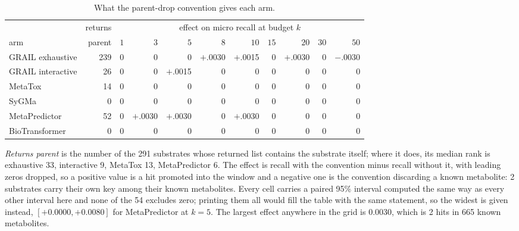 \begin{table}[h]
\centering\scriptsize
\begin{threeparttable}
\caption{What the parent-drop convention gives each arm.}
\label{tab:si-parentdrop}
\begin{tabular}{lrrrrrrrrrr}
\toprule
 & returns & \multicolumn{9}{c}{effect on micro recall at budget $k$} \\
\cmidrule(lr){3-11}
arm & parent & $1$ & $3$ & $5$ & $8$ & $10$ & $15$ & $20$ & $30$ & $50$ \\
\midrule
GRAIL exhaustive & 239 & $0$ & $0$ & $0$ & $+$.0030 & $+$.0015 & $0$ & $+$.0030 & $0$ & $-$.0030 \\
GRAIL interactive & 26 & $0$ & $0$ & $+$.0015 & $0$ & $0$ & $0$ & $0$ & $0$ & $0$ \\
MetaTox & 14 & $0$ & $0$ & $0$ & $0$ & $0$ & $0$ & $0$ & $0$ & $0$ \\
SyGMa & 0 & $0$ & $0$ & $0$ & $0$ & $0$ & $0$ & $0$ & $0$ & $0$ \\
MetaPredictor & 52 & $0$ & $+$.0030 & $+$.0030 & $0$ & $+$.0030 & $0$ & $0$ & $0$ & $0$ \\
BioTransformer & 0 & $0$ & $0$ & $0$ & $0$ & $0$ & $0$ & $0$ & $0$ & $0$ \\
\bottomrule
\end{tabular}
\begin{tablenotes}[flushleft]\footnotesize
\item \emph{Returns parent} is the number of the 291 substrates whose returned list contains the substrate itself; where it does, its median rank is exhaustive 33, interactive 9, MetaTox 13, MetaPredictor 6. The effect is recall with the convention minus recall without it, with leading zeros dropped, so a positive value is a hit promoted into the window and a negative one is the convention discarding a known metabolite: 2 substrates carry their own key among their known metabolites. Every cell carries a paired 95\% interval computed the same way as every other interval here and none of the 54 excludes zero; printing them all would fill the table with the same statement, so the widest is given instead, $[+0.0000, +0.0080]$ for MetaPredictor at $k=5$. The largest effect anywhere in the grid is 0.0030, which is 2 hits in 665 known metabolites.
\end{tablenotes}
\end{threeparttable}
\end{table}
